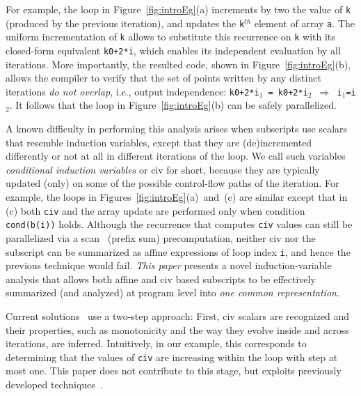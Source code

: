 \documentclass{sig-alternate}
\begin{document}
For example, the loop in Figure~\ref{fig:introEg}(a) increments
by two the value of {\tt k} (produced by the previous iteration),
and updates the {\tt k$^{th}$} element of array {\tt a}. 
%
The uniform incrementation of {\tt k} allows to substitute this
recurrence on {\tt k} with its closed-form equivalent {\tt k0+2*i},
which enables its independent evaluation by all iterations.
More importantly, the resulted code, shown in Figure~\ref{fig:introEg}(b),
%
allows the compiler to verify that the set of points written by any
distinct iterations {\em do not overlap}, i.e., output independence: 
{\tt k0+2*i$_1$~=~k0+2*i$_2$ $\Rightarrow$ i$_1$=i$_2$}. 
It follows that the loop in Figure~\ref{fig:introEg}(b) can be safely
parallelized. 


A known difficulty in performing this analysis arises when
subscripts use scalars that resemble induction variables, except 
that they are (de)incremented differently or not at all in 
different iterations of the loop.  We call such variables 
{\em conditional induction variables} or {\sc civ} for short,
because they are typically updated  (only) on some of 
the possible control-flow paths of the iteration.
%
For example, the loops in Figures~\ref{fig:introEg}(a)~and~(c) are 
similar except that in (c) both {\tt civ} and the array update are 
performed only when condition {\tt cond(b(i))} holds.  
Although the recurrence that computes {\tt civ} values can still 
be parallelized via a scan~\cite{segScan} (prefix sum) precomputation, 
neither {\sc civ} nor the subscript can be summarized as affine 
expressions of loop index {\tt i}, and hence the previous technique 
would fail.  
% 
{\em This paper} presents a novel induction-variable analysis that allows
both affine and {\sc civ} based subscripts to be effectively summarized
(and analyzed) at program level into {\em one common representation}.


Current solutions~\cite{Blume94RangeTest,SeqVars,VEG,PaduaDemDrInterproc,CohenBeyondMon} %
use a two-step approach:
First, {\sc civ} scalars are recognized and their properties, such as 
monotonicity and the way they evolve inside and across iterations, are inferred.   
Intuitively, in our example, this corresponds to determining that 
the values of {\tt civ} are increasing within the loop with step 
at most one.
This paper does not contribute to this stage, but  
exploits previously developed techniques~\cite{VEG}.
\end{document}
